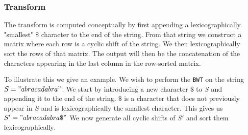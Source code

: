 \documentclass{article}
\begin{document}
\subsubsection{Transform}
The transform is computed conceptually by first appending a lexicographically "smallest" \(\$\) character to the end of the string. From that string we construct a matrix where each row is a cyclic shift of the string. We then lexicographically sort the rows of that matrix. The output will then be the concatenation of the characters appearing in the last column in the row-sorted matrix.

To illustrate this we give an example. We wish to perform the \texttt{BWT} on the string \(S = "abracadabra"\). We start by introducing a new character \(\$\) to \(S\) and appending it to the end of the string. \(\$\) is a character that does not previously appear in \(S\) and is lexicographically the smallest character. This gives us \(S' = "abracadabra\$"\) 
We now generate all cyclic shifts of \(S'\) and sort them lexicographically.
\end{document}
